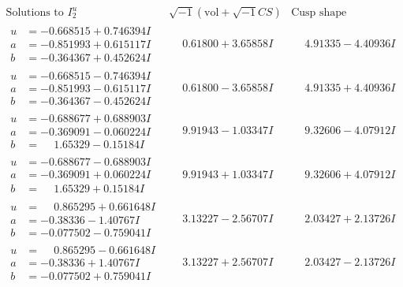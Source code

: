 \documentclass[1p]{elsarticle_modified}
\theoremstyle{definition}
\newcommand{\I}{\sqrt{-1}}
\begin{document}
$$\begin{array}{c|c|c}  
\text{Solutions to }I^u_{2}& \I (\text{vol} + \sqrt{-1}CS) & \text{Cusp shape}\\
 \hline 
\begin{aligned}
u &= -0.668515 + 0.746394 I \\
a &= -0.851993 + 0.615117 I \\
b &= -0.364367 + 0.452624 I\end{aligned}
 & \phantom{-}0.61800 + 3.65858 I & \phantom{-}4.91335 - 4.40936 I \\ \hline\begin{aligned}
u &= -0.668515 - 0.746394 I \\
a &= -0.851993 - 0.615117 I \\
b &= -0.364367 - 0.452624 I\end{aligned}
 & \phantom{-}0.61800 - 3.65858 I & \phantom{-}4.91335 + 4.40936 I \\ \hline\begin{aligned}
u &= -0.688677 + 0.688903 I \\
a &= -0.369091 - 0.060224 I \\
b &= \phantom{-}1.65329 - 0.15184 I\end{aligned}
 & \phantom{-}9.91943 - 1.03347 I & \phantom{-}9.32606 - 4.07912 I \\ \hline\begin{aligned}
u &= -0.688677 - 0.688903 I \\
a &= -0.369091 + 0.060224 I \\
b &= \phantom{-}1.65329 + 0.15184 I\end{aligned}
 & \phantom{-}9.91943 + 1.03347 I & \phantom{-}9.32606 + 4.07912 I \\ \hline\begin{aligned}
u &= \phantom{-}0.865295 + 0.661648 I \\
a &= -0.38336 - 1.40767 I \\
b &= -0.077502 - 0.759041 I\end{aligned}
 & \phantom{-}3.13227 - 2.56707 I & \phantom{-}2.03427 + 2.13726 I \\ \hline\begin{aligned}
u &= \phantom{-}0.865295 - 0.661648 I \\
a &= -0.38336 + 1.40767 I \\
b &= -0.077502 + 0.759041 I\end{aligned}
 & \phantom{-}3.13227 + 2.56707 I & \phantom{-}2.03427 - 2.13726 I \\ \hline\begin{aligned}

\end{aligned}
\end{array}$$
\end{document}
